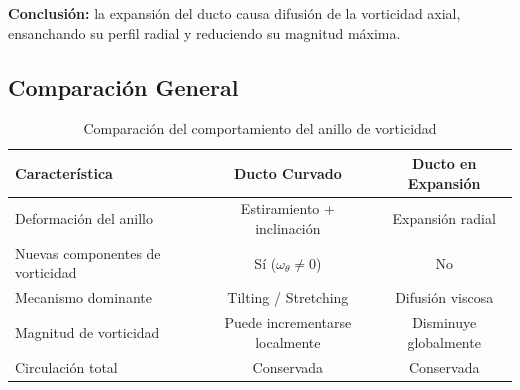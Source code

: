 \documentclass{article}
\begin{document}
\textbf{Conclusión:} la expansión del ducto causa difusión de la vorticidad axial, ensanchando su perfil radial y reduciendo su magnitud máxima.

\vspace{0.5cm}
\subsection*{Comparación General}

\begin{table}[h]
\centering
\begin{tabular}{|l|c|c|}
\hline
\textbf{Característica} & \textbf{Ducto Curvado} & \textbf{Ducto en Expansión} \\ \hline
Deformación del anillo & Estiramiento + inclinación & Expansión radial \\ \hline
Nuevas componentes de vorticidad & Sí ($\omega_\theta \neq 0$) & No \\ \hline
Mecanismo dominante & Tilting / Stretching & Difusión viscosa \\ \hline
Magnitud de vorticidad & Puede incrementarse localmente & Disminuye globalmente \\ \hline
Circulación total & Conservada & Conservada \\ \hline
\end{tabular}
\caption{Comparación del comportamiento del anillo de vorticidad}
\end{table}
\end{document}
